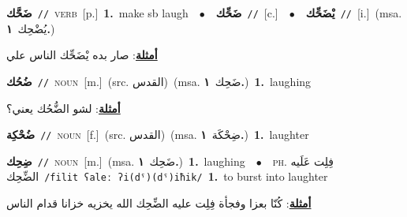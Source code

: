 \documentclass[10pt,a4paper,twoside]{article} %
\begin{document}
\begin{multicols}{2}
{\setlength\topsep{0pt}\textbf{\foreignlanguage{arabic}{ضَحَّك}}\ {\color{gray}\texttt{//}\color{black}}\ \textsc{verb}\ [p.]\ \textbf{1.}~make sb laugh\ \ $\bullet$\ \ \setlength\topsep{0pt}\textbf{\foreignlanguage{arabic}{ضَحِّك}}\ {\color{gray}\texttt{//}\color{black}}\ [c.]\ \ $\bullet$\ \ \setlength\topsep{0pt}\textbf{\foreignlanguage{arabic}{يْضَحِّك}}\ {\color{gray}\texttt{//}\color{black}}\ [i.]\ \color{gray}(msa. \foreignlanguage{arabic}{يُضْحِك}~\foreignlanguage{arabic}{\textbf{١.}})\color{black}\  \begin{flushright}\color{gray}\foreignlanguage{arabic}{\textbf{\underline{\foreignlanguage{arabic}{أمثلة}}}: صار بده يْضَحِّك الناس علي}\end{flushright}\color{black}} \vspace{2mm}

{\setlength\topsep{0pt}\textbf{\foreignlanguage{arabic}{ضُحُك}}\ {\color{gray}\texttt{//}\color{black}}\ \textsc{noun}\ [m.]\ (src. \color{gray}\foreignlanguage{arabic}{القدس}\color{black})\ \color{gray}(msa. \foreignlanguage{arabic}{ضَحِك}~\foreignlanguage{arabic}{\textbf{١.}})\color{black}\ \textbf{1.}~laughing\  \begin{flushright}\color{gray}\foreignlanguage{arabic}{\textbf{\underline{\foreignlanguage{arabic}{أمثلة}}}: لشو الضُّحُك يعني؟}\end{flushright}\color{black}} \vspace{2mm}

{\setlength\topsep{0pt}\textbf{\foreignlanguage{arabic}{ضُحْكِة}}\ {\color{gray}\texttt{//}\color{black}}\ \textsc{noun}\ [f.]\ (src. \color{gray}\foreignlanguage{arabic}{القدس}\color{black})\ \color{gray}(msa. \foreignlanguage{arabic}{ضِحْكَة}~\foreignlanguage{arabic}{\textbf{١.}})\color{black}\ \textbf{1.}~laughter\ } \vspace{2mm}

{\setlength\topsep{0pt}\textbf{\foreignlanguage{arabic}{ضِحِك}}\ {\color{gray}\texttt{//}\color{black}}\ \textsc{noun}\ [m.]\ \color{gray}(msa. \foreignlanguage{arabic}{ضَحِك}~\foreignlanguage{arabic}{\textbf{١.}})\color{black}\ \textbf{1.}~laughing\ \ $\bullet$\ \ \textsc{ph.} \color{gray} \foreignlanguage{arabic}{فِلِت عَلَيه الضِّحِك}\color{black}\ {\color{gray}\texttt{/{\sffamily filit ʕaleː ʔi(dˤ)(dˤ)iħik}/}\color{black}}\ \textbf{1.}~to burst into laughter\  \begin{flushright}\color{gray}\foreignlanguage{arabic}{\textbf{\underline{\foreignlanguage{arabic}{أمثلة}}}: كُنّا بعزا وفجأة فِلِت عليه الضِّحِك الله يخزيه خزانا قدام الناس}\end{flushright}\color{black}} \vspace{2mm}


\end{multicols}
\end{document}
